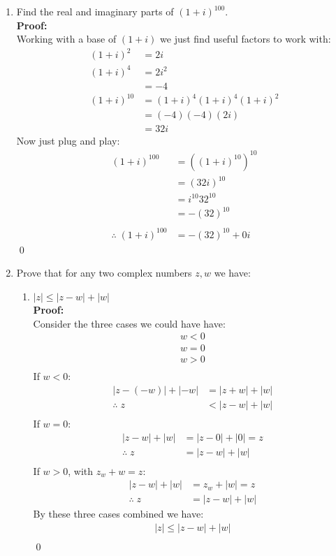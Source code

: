 \begin{enumerate}
	\item Find the real and imaginary parts of $(1 + i)^{100}.$ \\
	
	\textbf{Proof:} \\
	Working with a base of $(1 + i)$ we just find useful factors to work with:
	\begin{align*}
		(1 + i)^2 &= 2i \\
		(1 + i)^4 &= 2i^2 \\
		&= -4 \\
		(1 + i)^{10} &= (1 + i)^4(1 + i)^4(1 + i)^2 \\
		&= (-4)(-4)(2i) \\
		&= 32i
	\end{align*}
	Now just plug and play:
	\begin{align*}
		(1 + i)^{100} &= ((1 + i)^{10})^{10} \\
		&= (32i)^{10} \\
		&= i^{10}32^{10} \\
		&= -(32)^{10} \\
		\\
		\therefore \; (1 + i)^{100} &= -(32)^{10} +0i
	\end{align*}
	\qed


	\item Prove that for any two complex numbers $z, w$ we have:
	\begin{enumerate}
		\item $|z| \leq |z - w| + |w|$ \\
		
		\textbf{Proof:} \\
		Consider the three cases we could have have:
		\begin{align*}
			w < 0 \\
			w = 0 \\
			w > 0 \\
		\end{align*}
		If $w < 0$:
		\begin{align*}
			|z - (-w)| + |-w| &= |z + w| + |w| \\
			\therefore \; z &< |z - w| + |w| \\
		\end{align*}
		If $w = 0$:
		\begin{align*}
			|z - w| + |w| &= |z - 0| + |0| = z \\
			\therefore \; z &= |z -w| + |w| \\
		\end{align*} 
		If $w > 0$, with $z_w + w = z$:
		\begin{align*}
			|z - w| + |w| &= z_w + |w| = z \\
			\therefore \; z &= |z - w | + |w|
		\end{align*}
		By these three cases combined we have:
		\begin{align*}
			|z| \leq |z - w| + |w| \\
		\end{align*}
		\qed



\end{enumerate}
\end{enumerate}
